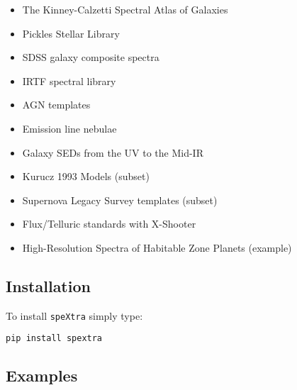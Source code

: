 \begin{itemize}

\item The Kinney-Calzetti Spectral Atlas of Galaxies

\item Pickles Stellar Library

\item SDSS galaxy composite spectra

\item IRTF spectral library

\item AGN templates

\item Emission line nebulae

\item Galaxy SEDs from the UV to the Mid-IR

\item Kurucz 1993 Models (subset)

\item Supernova Legacy Survey templates (subset)

\item Flux/Telluric standards with X-Shooter

\item High-Resolution Spectra of Habitable Zone Planets (example)


\end{itemize}



\subsection{Installation}

To install \texttt{speXtra} simply type: 

\texttt{pip install spextra}

 


\subsection{Examples%
  \label{examples}%
}

